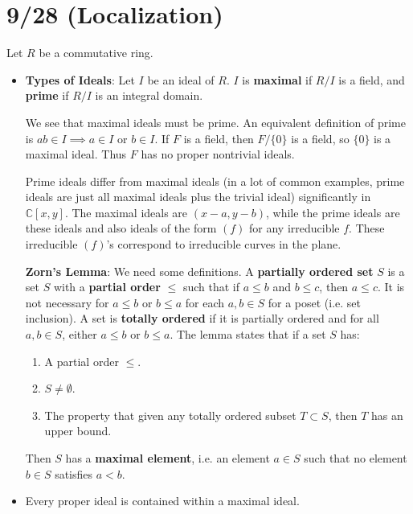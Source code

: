 \documentclass[11pt, oneside]{amsart}   	%
\theoremstyle{definition}
\begin{document}
\section{9/28 (Localization)}

Let $R$ be a commutative ring.

\begin{itemize}

	\item \textbf{Types of Ideals}: Let $I$ be an ideal of $R$. $I$ is \textbf{maximal} if $R / I$ is a field, and \textbf{prime} if $R / I$ is an integral 
	domain.
	
	We see that maximal ideals must be prime. An equivalent definition of prime is $ab\in I\implies a\in I$ or $b\in I$. If $F$ is a field, then $F / \{0\}$
	is a field, so $\{0\}$ is a maximal ideal. Thus $F$ has no proper nontrivial ideals.
	
	Prime ideals differ from maximal ideals (in a lot of common examples, prime ideals are just all maximal ideals plus the trivial ideal) significantly in 
	$\mathbb C[x, y]$. The maximal ideals are $(x - a, y - b)$, while the prime ideals are these ideals and also ideals of the form $(f)$ for any 
	irreducible $f$. These irreducible $(f)$'s correspond to irreducible curves in the plane.
	
	\textbf{Zorn's Lemma}: We need some definitions. A \textbf{partially ordered set} $S$ is a set $S$ with a \textbf{partial order} $\leq$ such that if 
	$a\leq b$ and $b\leq c$, then $a\leq c$. It is not necessary for $a\leq b$ or $b \leq a$ for each $a, b\in S$ for a poset (i.e. set inclusion). A set 
	is \textbf{totally ordered} if it is partially ordered and for all $a, b\in S$, either $a\leq b$ or $b\leq a$. The lemma states that if a set $S$ has:
	\begin{enumerate}
	
		\item A partial order $\leq$.
	
		\item $S\neq \emptyset$.
		
		\item The property that given any totally ordered subset $T\subset S$, then $T$ has an upper bound.
	
	\end{enumerate}
	Then $S$ has a \textbf{maximal element}, i.e. an element $a\in S$ such that no element $b\in S$ satisfies $a < b$.
	
	\item Every proper ideal is contained within a maximal ideal.
	

\end{itemize}
\end{document}
